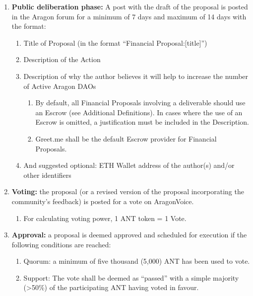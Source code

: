 \begin{enumerate}
\begin{enumerate}
		\begin{enumerate}
			
			\item \textbf{Public deliberation phase:} A post with the draft of the proposal is posted in the Aragon forum for a minimum of 7 days and maximum of 14 days with the format:
			\begin{enumerate}
				\item Title of Proposal (in the format ``Financial Proposal:[title]'')
				\item Description of the Action
				\item Description of why the author believes it will help to increase the number of Active Aragon \acp{DAO}
				
				\begin{enumerate}
					\item By default, all Financial Proposals involving a deliverable should use an Escrow (see Additional Definitions).
					In cases where the use of an Escrow is omitted, a justification must be included in the Description.
					\item Greet.me shall be the default Escrow provider for Financial Proposals.
				\end{enumerate}
			
				\item And suggested optional: ETH Wallet address of the author(s) and/or other identifiers
					
			\end{enumerate}

			\item \textbf{Voting:} the proposal (or a revised version of the proposal incorporating the community’s feedback) is posted for a vote on \gls{AragonVoice}.
			\begin{enumerate}
				\item For calculating voting power, 1 \ac{ANT} token = 1 Vote.
			\end{enumerate}
		
			\item \textbf{Approval:} a proposal is deemed approved and scheduled for execution if the following conditions are reached:
			\begin{enumerate}
				\item Quorum: a minimum of five thousand (5,000) \ac{ANT} has been used to vote.
				\item  Support: The vote shall be deemed as “passed” with a simple majority (>50\%) of the participating \ac{ANT} having voted in favour.
			\end{enumerate}
	

\end{enumerate}
\end{enumerate}
\end{enumerate}

